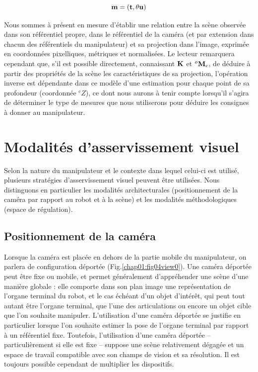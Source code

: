 \begin{equation}
{\bf m} = ({\bf t}, \theta {\bf u})  
\label{chap01:eq10}
\end{equation}

Nous sommes \`a pr\'esent en mesure d'établir une relation entre la scène 
observée dans son référentiel propre, dans le r\'ef\'erentiel de la cam\'era (et 
par extension dans chacun des r\'ef\'erentiels du manipulateur) et sa projection 
dans l'image, exprimée en coordonnées pixelliques, métriques et normalisées. Le 
lecteur remarquera cependant que, s'il est possible directement, connaissant 
${\bf K}$ et ${}^o{\bf M}_c$, de déduire à partir des propriétés de la scène 
les caractéristiques de sa projection, l'opération inverse est dépendante dans 
ce modèle d'une estimation pour chaque point de sa profondeur (coordonnée 
${}^cZ$), ce dont nous aurons \`a tenir compte lorsqu'il s'agira de d\'eterminer 
le type de mesures que nous utiliserons pour d\'eduire les consignes \`a donner 
au manipulateur.

\section{Modalit\'es d'asservissement visuel} 
\label{chap1-1}

Selon la nature du manipulateur et le contexte dans lequel celui-ci est 
utilis\'e, plusieurs strat\'egies d'asservissement visuel peuvent \^etre 
utilis\'ees. Nous distinguons en particulier les modalit\'es architecturales 
(positionnement de la cam\'era par rapport au robot et \`a la sc\`ene) et les 
modalit\'es m\'ethodologiques (espace de r\'egulation).

\subsection{Positionnement de la caméra} \label{chap1-1-0}

Lorsque la cam\'era est plac\'ee en dehors de la partie mobile du manipulateur, 
on parlera de configuration déportée (Fig.\ref{chap01:fig04view0}). Une cam\'era 
d\'eport\'ee peut \^etre fixe ou mobile, et permet g\'en\'eralement 
d'appr\'ehender une sc\`ene d'une mani\`ere globale : elle comporte dans son 
plan image une repr\'esentation de l'organe terminal du robot, et le cas 
\'ech\'eant d'un objet d'int\'er\^et, qui peut tout autant \^etre l'organe 
terminal, que l'une des articulations ou encore un objet cible que l'on 
souhaite manipuler. L'utilisation d'une cam\'era d\'eport\'ee se justifie en 
particulier lorsque l'on souhaite estimer la pose de l'organe terminal par 
rapport \`a un r\'ef\'erentiel fixe. Toutefois, l'utilisation d'une cam\'era 
d\'eport\'ee -- particuli\`erement si elle est fixe -- suppose une sc\`ene 
relativement d\'egag\'ee et un espace de travail compatible avec son champs de 
vision et sa r\'esolution. Il est toujours possible cependant de multiplier les 
dispositifs.

